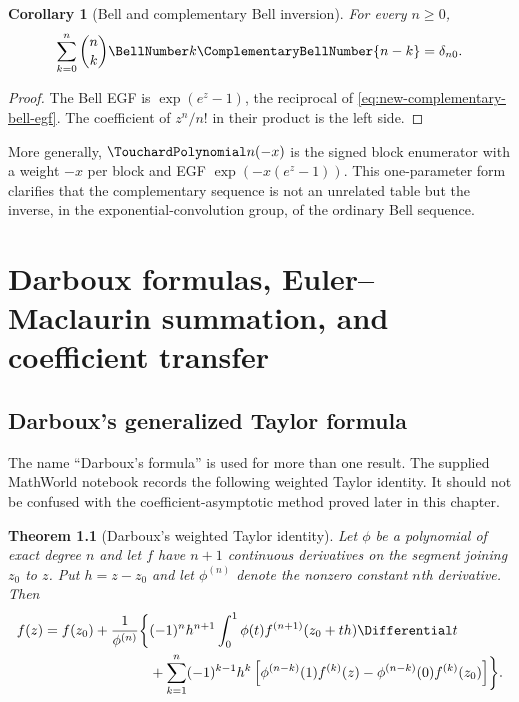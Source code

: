 \documentclass[11pt,a4paper,oneside,openany]{book}
\newtheorem{theorem}{Theorem}[chapter]
\newtheorem{corollary}[theorem]{Corollary}
\theoremstyle{definition}
\theoremstyle{remark}
\begin{document}
\begin{corollary}[Bell and complementary Bell inversion]\label{cor:new-bell-complement-inverse}
For every $n\ge0$,
\begin{equation}\label{eq:new-bell-complement-inverse}
 \sum_{k=0}^n\binom nk\BellNumber k\ComplementaryBellNumber{n-k}=\delta_{n0}.
\end{equation}
\end{corollary}

\begin{proof}
The Bell EGF is $\exp(e^z-1)$, the reciprocal of
\eqref{eq:new-complementary-bell-egf}.  The coefficient of $z^n/n!$ in their
product is the left side.
\end{proof}

More generally, $\TouchardPolynomial n(-x)$ is the signed block enumerator with a weight $-x$
per block and EGF $\exp(-x(e^z-1))$.  This one-parameter form clarifies that
the complementary sequence is not an unrelated table but the inverse, in the
exponential-convolution group, of the ordinary Bell sequence.

\chapter{Darboux formulas, Euler--Maclaurin summation, and coefficient transfer}
\label{ch:darboux-euler-maclaurin}

\section{Darboux's generalized Taylor formula}

The name ``Darboux's formula'' is used for more than one result.  The supplied
MathWorld notebook records the following weighted Taylor identity.  It should
not be confused with the coefficient-asymptotic method proved later in this
chapter.

\begin{theorem}[Darboux's weighted Taylor identity]\label{thm:new-darboux-taylor}
Let $\phi$ be a polynomial of exact degree $n$ and let $f$ have $n+1$
continuous derivatives on the segment joining $z_0$ to $z$.  Put $h=z-z_0$
and let $\phi^{(n)}$ denote the nonzero constant $n$th derivative.  Then
\begin{align}
 f(z)=f(z_0)+\frac1{\phi^{(n)}}\biggl\{&(-1)^n h^{n+1}
 \int_0^1\phi(t)f^{(n+1)}(z_0+th)\Differential t
 \notag\\
 &+\sum_{k=1}^n(-1)^{k-1}h^k
 \left[\phi^{(n-k)}(1)f^{(k)}(z)
       -\phi^{(n-k)}(0)f^{(k)}(z_0)\right]\biggr\}.
 \label{eq:new-darboux-taylor}
\end{align}
\end{theorem}
\end{document}
